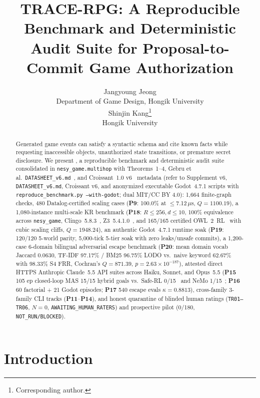 \documentclass{article}
\title{TRACE-RPG: A Reproducible Benchmark and Deterministic Audit Suite for Proposal-to-Commit Game Authorization}
\author{
  Jangyoung Jeong \\
  Department of Game Design, Hongik University \\
  \And
  Shinjin Kang\thanks{Corresponding author.} \\
  Hongik University \\
}
\begin{document}
\maketitle

\begin{abstract}
Generated game events can satisfy a syntactic schema and cite known facts while requesting inaccessible objects, unauthorized state transitions, or premature secret disclosure. We present \system{}, a reproducible benchmark and deterministic audit suite consolidated in \texttt{nesy\_game.multihop} with Theorems~1--4, Gebru et al.\ \texttt{DATASHEET\_v6.md}~\cite{gebru2021datasheets}, and Croissant~1.0 v6~\cite{akhtar2024croissant} metadata (refer to Supplement v6, \texttt{DATASHEET\_v6.md}, Croissant v6, and anonymized executable Godot~4.7.1 scripts with \texttt{reproduce\_benchmark.py --with-godot}; dual MIT/CC BY 4.0): 1,664 finite-graph checks, 480 Datalog-certified scaling cases (\textbf{P9}: 100.0\% at $\le$7.12\,$\mu$s, $Q{=}1100.19$), a 1,080-instance multi-scale KR benchmark (\textbf{P18}: $R{\le}256, d{\le}10$, 100\% equivalence across \texttt{nesy\_game}, Clingo~5.8.3~\cite{gebser2019clingo}, Z3~5.4.1.0~\cite{demoura2008z3}, and 165/165 certified OWL~2~RL~\cite{motik2012owl2profiles} with cubic scaling cliffs, $Q{=}1948.24$), an authentic Godot~4.7.1 runtime soak (\textbf{P19}: 120/120 5-world parity, 5,000-tick 5-tier soak with zero leaks/unsafe commits), a 1,200-case 6-domain bilingual adversarial escape benchmark (\textbf{P20}: mean domain vocab Jaccard 0.0630, TF-IDF 97.17\% / BM25 96.75\% LODO vs.\ naive keyword 62.67\% with 98.33\% S4 FRR, Cochran's $Q{=}871.39$, $p=2.63\times 10^{-187}$), attested direct HTTPS Anthropic Claude~5.5 API suites across Haiku, Sonnet, and Opus~5.5 (\textbf{P15} 105 ep closed-loop MAS 15/15 hybrid goals vs.\ Safe-RL 0/15~\cite{alshiekh2018shield} and NeMo 1/15~\cite{rebedea2023nemo}; \textbf{P16} 60 factorial + 21 Godot episodes; \textbf{P17} 540 escape evals $\kappa{=}0.8813$), cross-family 3-family CLI tracks (\textbf{P11}--\textbf{P14}), and honest quarantine of blinded human ratings (\texttt{TR01--TR06}, $N{=}0$, \texttt{AWAITING\_HUMAN\_RATERS}) and prospective pilot (0/180, \texttt{NOT\_RUN/BLOCKED}).
\end{abstract}

\section{Introduction}

\end{document}
